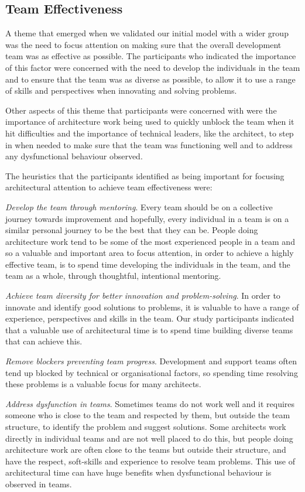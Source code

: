 \subsection{Team Effectiveness}

A theme that emerged when we validated our initial model with a wider group was the need to focus attention on making sure that the overall development team was as effective as possible.  The participants who indicated the importance of this factor were concerned with the need to develop the individuals in the team and to ensure that the team was as diverse as possible, to allow it to use a range of skills and perspectives when innovating and solving problems.

Other aspects of this theme that participants were concerned with were the importance of architecture work being used to quickly unblock the team when it hit difficulties and the importance of technical leaders, like the architect, to step in when needed to make sure that the team was functioning well and to address any dysfunctional behaviour observed.

The heuristics that the participants identified as being important for focusing architectural attention to achieve team effectiveness were:
\begin{description}
	\item \emph{Develop the team through mentoring}.  Every team should be on a collective journey towards improvement and hopefully, every individual in a team is on a similar personal journey to be the best that they can be.  People doing architecture work tend to be some of the most experienced people in a team and so a valuable and important area to focus attention, in order to achieve a highly effective team, is to spend time developing the individuals in the team, and the team as a whole, through thoughtful, intentional mentoring.
	\item \emph{Achieve team diversity for better innovation and problem-solving}.  In order to innovate and identify good solutions to problems, it is valuable to have a range of experience, perspectives and skills in the team.  Our study participants indicated that a valuable use of architectural time is to spend time building diverse teams that can achieve this.
	\item \emph{Remove blockers preventing team progress}.  Development and support teams often tend up blocked by technical or organisational factors, so spending time resolving these problems is a valuable focus for many architects.
	\item \emph{Address dysfunction in teams}.  Sometimes teams do not work well and it requires someone who is close to the team and respected by them, but outside the team structure, to identify the problem and suggest solutions.  Some architects work directly in individual teams and are not well placed to do this, but people doing architecture work are often close to the teams but outside their structure, and have the respect, soft-skills and experience to resolve team problems.  This use of architectural time can have huge benefits when dysfunctional behaviour is observed in teams.
\end{description}

